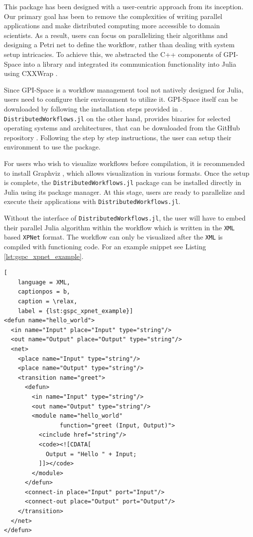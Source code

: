 \documentclass{juliacon}
\begin{document}
This package has been designed with a user-centric approach from its inception.
Our primary goal has been to remove the complexities of writing parallel applications and make distributed computing more accessible to domain scientists.
As a result, users can focus on parallelizing their algorithms and designing a Petri net to define the workflow, rather than dealing with system setup intricacies. 
To achieve this, we abstracted the C++ components of GPI-Space into a library and integrated its communication functionality into Julia using CXXWrap \cite{cxxwrap}.\vskip 6pt

Since GPI-Space is a workflow management tool not natively designed for Julia, users need to configure their environment to utilize it.
GPI-Space itself can be downloaded by following the installation steps provided in \cite{GSPC}.
\texttt{DistributedWorkflows.jl} on the other hand, provides binaries for selected operating systems and architectures, that can be downloaded from the GitHub repository \cite{DistributedWorkflows}.
Following the step by step instructions, the user can setup their environment to use the package.\vskip 6pt

For users who wish to visualize workflows before compilation, it is recommended to install Graphviz \cite{Graphviz81:online}, which allows visualization in various formats. 
Once the setup is complete, the \texttt{DistributedWorkflows.jl} package can be installed directly in Julia using its package manager. 
At this stage, users are ready to parallelize and execute their applications with \texttt{DistributedWorkflows.jl}.\vskip 6pt

Without the interface of \texttt{DistributedWorkflows.jl}, the user will have to embed their parallel Julia algorithm within the workflow which is written in the \verb+XML+ based \verb+XPNet+ format. 
The workflow can only be visualized after the \verb+XML+ is compiled with functioning code.
For an example snippet see Listing \ref{lst:gspc_xpnet_example}.

\begin{lstlisting}[
    language = XML,
    captionpos = b,
    caption = \relax,
    label = {lst:gspc_xpnet_example}]
<defun name="hello_world">
  <in name="Input" place="Input" type="string"/>
  <out name="Output" place="Output" type="string"/>
  <net>
    <place name="Input" type="string"/>
    <place name="Output" type="string"/>
    <transition name="greet">
      <defun>
        <in name="Input" type="string"/>
        <out name="Output" type="string"/>
        <module name="hello_world" 
                function="greet (Input, Output)">
          <cinclude href="string"/>
          <code><![CDATA[
            Output = "Hello " + Input;
          ]]></code>
        </module>
      </defun>
      <connect-in place="Input" port="Input"/>
      <connect-out place="Output" port="Output"/>
    </transition>
  </net>
</defun>
\end{lstlisting}
\end{document}
